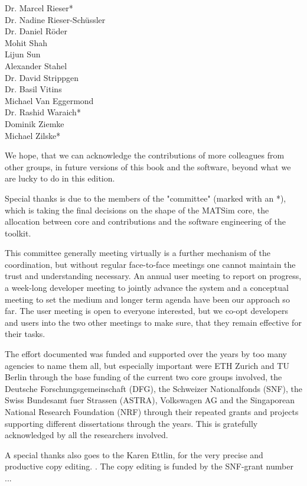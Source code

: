 \begin{multicols}{3}
Dr. Marcel Rieser\mbox{*} \\
Dr. Nadine Rieser-Schüssler \\
Dr. Daniel Röder \\
Mohit Shah \\
Lijun Sun \\
Alexander Stahel \\
Dr. David Strippgen \\
Dr. Basil Vitins \\
Michael Van Eggermond \\
Dr. Rashid Waraich\mbox{*} \\
Dominik Ziemke \\
Michael Zilske\mbox{*} \\
\end{multicols}
% 
We hope, that we can acknowledge the contributions of more colleagues from other groups, in future versions of this book and the software, beyond what we are lucky to do in this edition.   

Special thanks is due to the members of the "committee" (marked with an \mbox{*}), which is taking the final decisions on the shape of the MATSim core, the allocation between core and contributions and the software engineering of the toolkit.

This committee generally meeting virtually is a further mechanism of the coordination, but without regular face-to-face meetings one cannot maintain the trust and understanding necessary. An annual user meeting to report on progress, a week-long developer meeting to jointly advance the system and a conceptual meeting to set the medium and longer term agenda have been our approach so far. The user meeting is open to everyone interested, but we co-opt developers and users into the two other meetings to make sure, that they remain effective for their tasks. 

The effort documented was funded and supported over the years by too many agencies to name them all, but especially important were ETH Zurich and TU Berlin through the base funding of the current two core groups involved, the Deutsche Forschungsgemeinschaft (DFG), the Schweizer Nationalfonds (SNF), the Swiss Bundesamt fuer Strassen (ASTRA), Volkswagen AG and the Singaporean National Research Foundation (NRF) through their repeated grants and projects supporting different dissertations through the years. This is gratefully acknowledged by all the researchers involved. 

A special thanks also goes to the Karen Ettlin, for the very precise and productive copy editing. . The copy editing is funded by the SNF-grant number ... 

